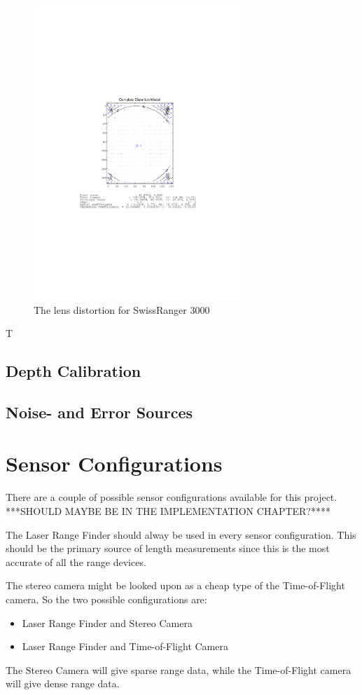\begin{figure}[htbp]
    \centering
    \includegraphics[width=0.7\textwidth]{pics/sr3000_comp_dist}
    \caption{The lens distortion for SwissRanger 3000}
    \label{chap3:fig-sr3000-comp-lensdist}
\end{figure}
T


\subsection{Depth Calibration}




\subsection{Noise- and Error Sources}






\section{Sensor Configurations}
There are a couple of possible sensor configurations available for this project. ***SHOULD
MAYBE BE IN THE IMPLEMENTATION CHAPTER?****

The Laser Range Finder should alway be used in every sensor configuration. This should be
the primary source of length measurements since this is the most accurate of all the range
devices. 

The stereo camera might be looked upon as a cheap type of the Time-of-Flight camera. So
the two possible configurations are:
\begin{itemize}
    \item Laser Range Finder and Stereo Camera
    \item Laser Range Finder and Time-of-Flight Camera
\end{itemize}
The Stereo Camera will give sparse range data, while the Time-of-Flight camera will give
dense range data. 




